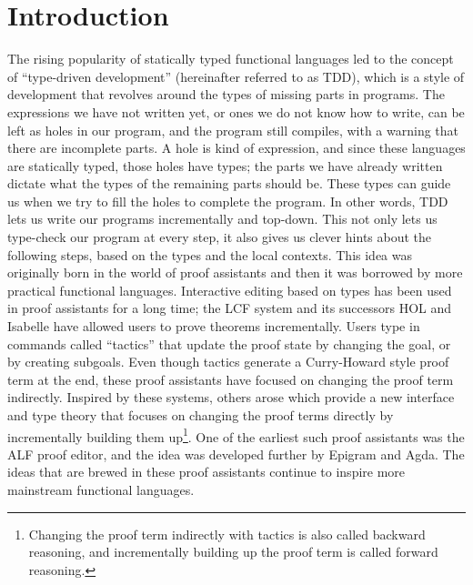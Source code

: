 \chapter{Introduction} \label{chap:introduction}

The rising popularity of statically typed functional languages led to
the concept of ``type-driven development'' (hereinafter referred to as TDD),
which is a style of development that revolves around the types of missing parts in
programs. The expressions we have not written yet, or ones we do not know
how to write, can be left as holes in our program, and the program still
compiles, with a warning that there are incomplete parts.
A hole is kind of expression, and since these languages are
statically typed, those holes have types; the parts
we have already written dictate what the types of the remaining parts should
be. These types can guide us when we try to fill the holes to complete the program.
In other words, TDD lets us write our programs incrementally and top-down. This
not only lets us type-check our program at every step, it also gives us clever
hints about the following steps, based on the types and the local contexts.
This idea was originally born in the world of proof assistants and then it was
borrowed by more practical functional languages.
Interactive editing based on types has been used in proof assistants for a long
time; the LCF system\cite{lcf} and its successors HOL and
Isabelle\cite{isabelle} have allowed users to prove theorems
incrementally. Users type in commands called ``tactics'' that update the proof state by
changing the goal, or by creating subgoals.
Even though tactics generate a Curry-Howard style proof term at the end, these
proof assistants have focused on changing the proof term indirectly.
Inspired by these systems, others arose which
provide a new interface and type theory that focuses on
changing the proof terms directly by incrementally building them
up\footnote{Changing the proof term indirectly with tactics is also called
backward reasoning, and incrementally building up the proof term is called
forward reasoning.}. One of the earliest such proof assistants was the ALF proof
editor\cite{ALF}, and the idea was developed further by Epigram\cite{epigram}
and Agda\cite{agda}.
The ideas that are brewed in these proof assistants continue to inspire more
mainstream functional languages.

